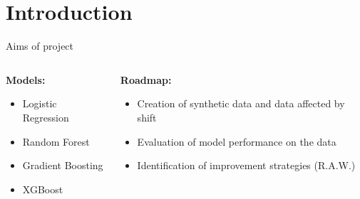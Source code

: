 
%   




\section{Introduction}


\begin{frame}{Aims of project}
	\begin{columns} %
		\begin{column}{0.5\textwidth}
			\textbf{Models:}
			\begin{tcolorbox}[colframe=blue!50!black, colback=blue!5, coltitle=black, sharp corners]
				\begin{itemize}
					\item Logistic Regression
					\item Random Forest
					\item Gradient Boosting
					\item XGBoost
				\end{itemize}
			\end{tcolorbox}
		\end{column}
		
		\vspace{0.5cm}
		\begin{column}{0.5\textwidth}
			\textbf{Roadmap:}
			\begin{itemize}
				\item Creation of synthetic data and data affected by shift
				\item Evaluation of model performance on the data
				\item Identification of improvement strategies (R.A.W.)
			\end{itemize}
		\end{column}
	\end{columns} %
\end{frame}


